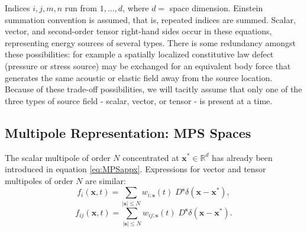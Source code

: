 Indices $i,j,m,n$ run from $1,...,d$, where $d=$ space dimension. Einstein
summation convention is assumed, that is, repeated indices are summed.
Scalar, vector, and second-order tensor right-hand sides occur in
these equations, representing energy sources of several types.
There is some redundancy amongst these possibilities: for example a
spatially localized
constitutive law defect (pressure or stress source) may be exchanged
for an equivalent body force that generates the same acoustic or
elastic field away from the source location. Because of these
trade-off possibilities, we will tacitly assume that only one of the
three types of source field - scalar, vector, or tensor - is present at a time.

\subsection{Multipole Representation: MPS Spaces}

The scalar multipole of order $N$ concentrated at $\mathbf x^*\in\mathbb R^d$ has already been introduced in equation \ref{eq:MPSappx}.
Expressions for vector and tensor multipoles of order $N$ are similar:
\begin{equation}\label{eq:MPSappxVec}
	f_i(\mathbf x,t) = \sum_{|\mathbf s| \le N} w_{i;\mathbf s}(t) \; D^{\mathbf s} \delta(\mathbf x- \mathbf x^*),
\end{equation}
\begin{equation}\label{eq:MPSappxTen}
	f_{ij}(\mathbf x,t) = \sum_{|\mathbf s| \le N} w_{ij;\mathbf s}(t) \; D^{\mathbf s} \delta(\mathbf x- \mathbf x^*).
\end{equation}

